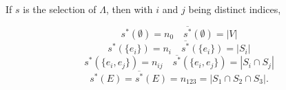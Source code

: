If $s$ is the selection of $\Lambda$, then with $i$ and $j$ being distinct indices,

$$s^*(\emptyset) = n_0 \quad \overline{s^*}(\emptyset) = |V|$$
$$s^*(\{e_i\}) = n_i \quad \overline{s^*}(\{e_i\}) = |S_i|$$
$$s^*(\{e_i, e_j\}) = n_{ij} \quad \overline{s^*}(\{e_i, e_j\}) = |S_i \cap S_j|$$
$$s^*(E) = \overline{s^*}(E) = n_{123} = |S_1 \cap S_2 \cap S_3|.$$
